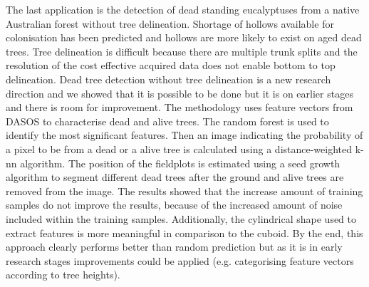\documentclass{subfiles}
\begin{document}
\par The last application is the detection of dead standing eucalyptuses from a native Australian forest without tree delineation. Shortage of hollows available for colonisation has been predicted and hollows are more likely to exist on aged dead trees. Tree delineation is difficult because there are multiple trunk splits and the resolution of the cost effective acquired data does not enable bottom to top delineation. Dead tree detection without tree delineation is a new research direction and we showed that it is possible to be done but it is on earlier stages and there is room for improvement. The methodology uses feature vectors from DASOS to characterise dead and alive trees. The random forest is used to identify the most significant features. Then an image indicating the probability of a pixel to be from a dead or a alive tree is calculated using a distance-weighted k-nn algorithm. The position of the fieldplots is estimated using a seed growth algorithm to segment different dead trees after the ground and alive trees are removed from the image. The results showed that the increase amount of training samples do not improve the results, because of the increased amount of noise included within the training samples. Additionally, the cylindrical shape used to extract features is more meaningful in comparison to the cuboid. By the end, this approach clearly performs better than random prediction but as it is in early research stages improvements could be applied (e.g. categorising feature vectors according to tree heights). 
\end{document}
